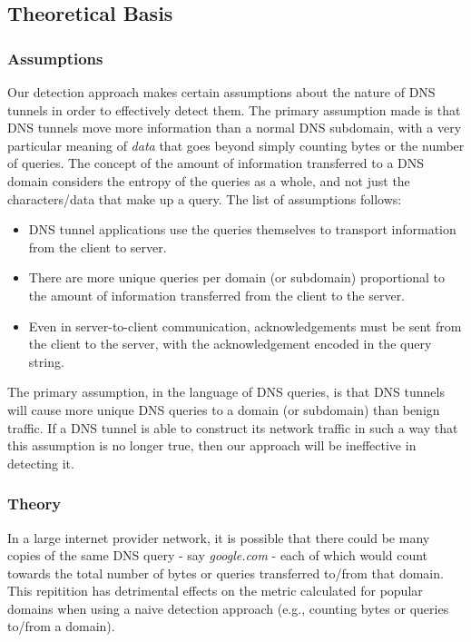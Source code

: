 \documentclass{llncs}
\begin{document}
\subsection{Theoretical Basis}
\subsubsection{Assumptions}

Our detection approach makes certain assumptions about the nature of
DNS tunnels in order to effectively detect them. The primary
assumption made is that DNS tunnels move more information than a
normal DNS subdomain, with a very particular meaning of \emph{data}
that goes beyond simply counting bytes or the number of queries. The
concept of the amount of information transferred to a DNS domain
considers the entropy of the queries as a whole, and not just the
characters/data that make up a query.  The list of assumptions
follows:

\begin{itemize}
\item DNS tunnel applications use the queries themselves to transport
  information from the client to server.
\item There are more unique queries per domain (or subdomain)
  proportional to the amount of information transferred from the
  client to the server.
\item Even in server-to-client communication, acknowledgements must be
  sent from the client to the server, with the acknowledgement encoded
  in the query string.
\end{itemize}

The primary assumption, in the language of DNS queries, is that DNS
tunnels will cause more unique DNS queries to a domain (or subdomain)
than benign traffic. If a DNS tunnel is able to construct its network
traffic in such a way that this assumption is no longer true, then our
approach will be ineffective in detecting it.

\subsubsection{Theory}

In a large internet provider network, it is possible that there could
be many copies of the same DNS query - say \emph{google.com} - each of
which would count towards the total number of bytes or queries
transferred to/from that domain. This repitition has detrimental
effects on the metric calculated for popular domains when using a
naive detection approach (e.g., counting bytes or queries to/from a
domain).
\end{document}
